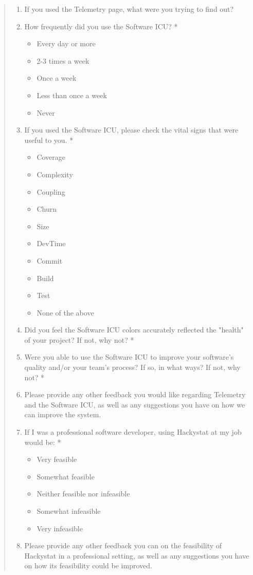 \begin{quote}
\begin{enumerate}
\item If you used the Telemetry page, what were you trying to find out?

\item How frequently did you use the Software ICU? *
\begin{itemize}
\item Every day or more
\item 2-3 times a week
\item Once a week
\item Less than once a week
\item Never
\end{itemize}

\item If you used the Software ICU, please check the vital signs that were useful to you. *
\begin{itemize}
\item Coverage
\item Complexity
\item Coupling
\item Churn
\item Size
\item DevTime
\item Commit
\item Build
\item Test
\item None of the above
\end{itemize}

\item Did you feel the Software ICU colors accurately reflected the "health" of your project? If not, why not? *

\item Were you able to use the Software ICU to improve your software's quality and/or your team's process? If so, in what ways? If not, why not? *

\item Please provide any other feedback you would like regarding Telemetry and the Software ICU, as well as any suggestions you have on how we can improve the system.

\item If I was a professional software developer, using Hackystat at my job would be: *
\begin{itemize}
\item Very feasible
\item Somewhat feasible
\item Neither feasible nor infeasible
\item Somewhat infeasible
\item Very infeasible
\end{itemize}

\item Please provide any other feedback you can on the feasibility of Hackystat in a professional setting, as well as any suggestions you have on how its feasibility could be improved. 

\end{enumerate}

\end{quote} 

